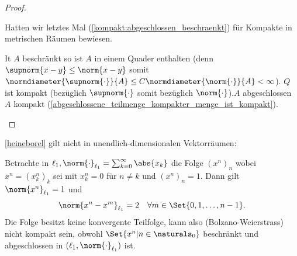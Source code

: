 \begin{proof}
    \begin{proofdescription}
        \item[\hin] Hatten wir letztes Mal (\ref{kompakt:abgeschlossen_beschraenkt}) für Kompakte in metrischen Räumen bewiesen.
        
        \item[\rueck] It \( A \) beschränkt so ist \( A \) in einem Quader enthalten (denn \( \supnorm{x-y}\leq  \norm{x-y} \) somit \( \normdiameter{\supnorm{\cdot}}{A}\leq C\normdiameter{\norm{\cdot}}{A}<\infty \)). \( Q \) ist kompakt (bezüglich \( \supnorm{\cdot} \) somit bezüglich \( \norm{\cdot} \)).\( A \) abgeschlossen \timplies \( A \) kompakt (\ref{abgeschlossene_teilmenge_kompakter_menge_ist_kompakt}).
    \end{proofdescription}
\end{proof}
\begin{bemerkung*}
    \ref{heineborel} gilt nicht in unendlich-dimensionalen Vektorräumen:

    Betrachte in \( \ell_1, \norm{\cdot}_{\ell_1}=\sum_{k=0}^{\infty}\abs{x_k} \) die Folge \( (x^n)_n \) wobei \( x^n=(x^n_k)_k \) sei mit \( x^n_k=0 \) für \( n\neq k \) und \( (x^n)_n=1 \). Dann gilt \( \norm{x^n}_{\ell_1}=1 \) und
    \begin{align*}
        \norm{x^n-x^m}_{\ell_1}=2\quad \forall m\in \Set{0,1,\dotsc,n-1}.
    \end{align*}
    \timplies Die Folge besitzt keine konvergente Teilfolge, kann also (Bolzano-Weierstrass) nicht kompakt sein, obwohl \( \Set{x^n|n\in \naturals_0} \) beschränkt und abgeschlossen in \( (\ell_1, \norm{\cdot}_{\ell_1}) \) ist.
\end{bemerkung*}